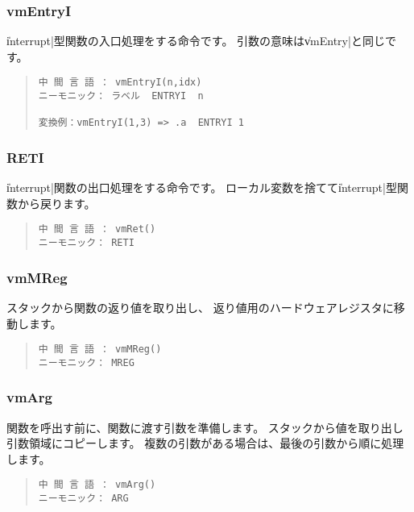 \subsubsection{vmEntryI}

\|interrupt|型関数の入口処理をする命令です。
引数の意味は\|vmEntry|と同じです。

\begin{quote}
\begin{verbatim}
中 間 言 語 ： vmEntryI(n,idx)
ニーモニック： ラベル  ENTRYI  n

変換例：vmEntryI(1,3) => .a  ENTRYI 1
\end{verbatim}
\end{quote}

\subsubsection{RETI}

\|interrupt|関数の出口処理をする命令です。
ローカル変数を捨てて\|interrupt|型関数から戻ります。

\begin{quote}
\begin{verbatim}
中 間 言 語 ： vmRet()
ニーモニック： RETI
\end{verbatim}
\end{quote}

\subsubsection{vmMReg}

スタックから関数の返り値を取り出し、
返り値用のハードウェアレジスタに移動します。

\begin{quote}
\begin{verbatim}
中 間 言 語 ： vmMReg()
ニーモニック： MREG
\end{verbatim}
\end{quote}

\subsubsection{vmArg}

関数を呼出す前に、関数に渡す引数を準備します。
スタックから値を取り出し引数領域にコピーします。
複数の引数がある場合は、最後の引数から順に処理します。

\begin{quote}
\begin{verbatim}
中 間 言 語 ： vmArg()
ニーモニック： ARG
\end{verbatim}
\end{quote}


